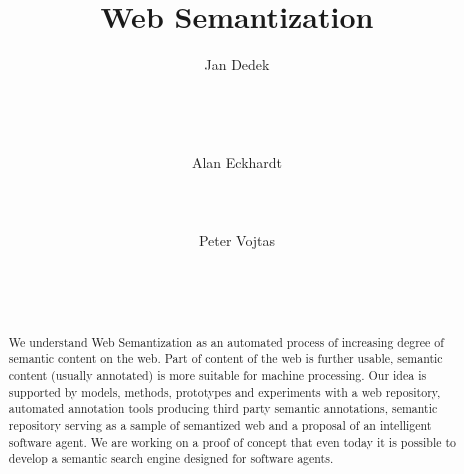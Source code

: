 \documentclass{www2009-submission}
\begin{document}
%
\title{Web Semantization}


\author{
\alignauthor Jan Dedek\\
       \\
       \\
       \\
       \\
\alignauthor Alan Eckhardt\\
       \\
       \\
       \\
\alignauthor Peter Vojtas\\
       \\
       \\
       \\
}

\maketitle
\begin{abstract}
We understand Web Semantization as an automated process of increasing degree of semantic content on the web. Part of content of the web is further usable, semantic content (usually annotated) is more suitable for machine processing.
Our idea is supported by models, methods, prototypes and experiments with a web repository, automated annotation tools producing third party semantic annotations, semantic repository serving as a sample of semantized web and a proposal of an intelligent software agent. We are working on a proof of concept that even today it is possible to develop a semantic search engine designed for software agents.
\end{abstract}

\end{document}
